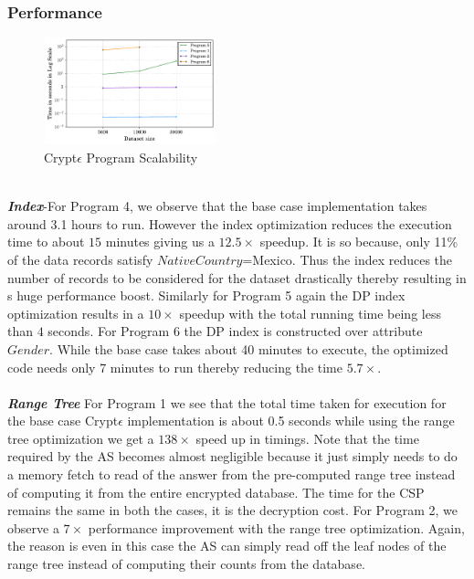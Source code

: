 \subsubsection{Performance}
\begin{figure}\includegraphics[width=5cm,height=3.1cm]{scalet.pdf} \caption{ Crypt$\epsilon$ Program Scalability} \end{figure}
\textit{\textbf{\\Index}}-For Program 4, we observe that the base case implementation takes around 3.1 hours to run. However the  index optimization reduces the execution time to about $15$ minutes  giving us a $12.5\times $ speedup. It is so because, only 11\% of the data records satisfy $NativeCountry$=Mexico. Thus the index reduces the number of records to be considered for the dataset drastically thereby resulting in s huge performance boost. Similarly for Program 5 again the DP index optimization results in a $10\times$ speedup with the total running time being less than $4$ seconds. For Program 6 the DP index is constructed over attribute $Gender$. While the base case takes about 40 minutes to execute, the optimized code needs only 7 minutes to run thereby reducing the time  $5.7\times$.\\\\\textit{\textbf{Range Tree}}
 For Program 1 we see that the total time taken for execution for the base case Crypt$\epsilon$ implementation is about 0.5 seconds while using the range tree optimization we get a $138\times$ speed up in timings. Note that the time required by the \textsf{AS} becomes almost negligible because it just simply needs to do a memory fetch to read of the answer from the pre-computed range tree instead of computing it from the entire encrypted database. The time for the \textsf{CSP} remains the same in both the cases, it is the decryption cost. For Program 2, we observe a $7\times$ performance improvement with the range tree optimization. Again, the reason is even in this case the \textsf{AS} can simply read off the leaf nodes of the range tree instead of computing their counts from the database. 
